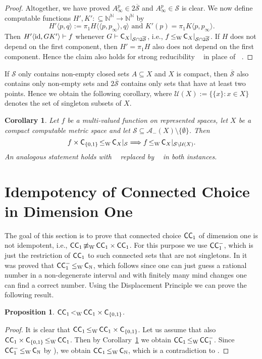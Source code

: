 \documentclass[a4paper]{amsart}
\def\AA{{\mathcal A}}
\def\SS{{\mathcal S}}
\def\UU{{\mathcal U}}
\def\IN{{\mathbb{N}}}
\def\TO{\Longrightarrow}
\def\In{\subseteq}
\def\id{{\rm id}}
\def\C{\mbox{\rm\sffamily C}}
\def\ConC{\mbox{\rm\sffamily CC}}
\def\leqW{\mathop{\leq_{\mathrm{W}}}}
\def\nequivW{\mathop{\not\equiv_{\mathrm{W}}}}
\def\leqSW{\mathop{\leq_{\mathrm{sW}}}}
\def\lW{\mathop{<_{\mathrm{W}}}}
\newtheorem{proposition}[theorem]{Proposition}
\newtheorem{corollary}[theorem]{Corollary}
\theoremstyle{definition}
\begin{document}
\begin{proof}
Altogether, we have proved $A_\infty^p\in2\overline{\SS}$ and $A_\infty^p\in\SS$ is clear.
We now define computable functions $H',K':\In\IN^\IN\to\IN^\IN$ by
\[H'\langle p,q\rangle:=\pi_1H\langle\langle p,p_\infty\rangle,q\rangle\mbox{ and }K'(p)=\pi_1K\langle p,p_\infty\rangle.\]
Then $H'\langle\id,GK'\rangle\vdash f$ whenever $G\vdash\C_X|_{\SS\cap2\overline{\SS}}$, i.e., $f\leqW\C_X|_{\SS\cap2\overline{\SS}}$.
If $H$ does not depend on the first component, then $H'=\pi_1H$ also does not depend on the first component. 
Hence the claim also holds for strong reducibility $\leqSW$ in place of $\leqW$. 
\end{proof}

If $\SS$ only contains non-empty closed sets $A\In X$ and $X$ is compact, then $\overline{\SS}$
also contains only non-empty sets and $2\overline{\SS}$ contains only sets that have at least
two points. Hence we obtain the following corollary, where $\UU(X):=\{\{x\}:x\in X\}$ denotes the
set of singleton subsets of $X$.

\begin{corollary}
\label{cor:displacement}
Let $f$ be a multi-valued function on represented spaces, 
let $X$ be a compact computable metric space and let $\SS\In\AA_-(X)\setminus\{\emptyset\}$.
Then
\[f\times\C_{\{0,1\}}\leqW\C_X|_\SS\TO f\leqW\C_X|_{\SS\setminus\UU(X)}.\]
An analogous statement holds with $\leqW$ replaced by $\leqSW$ in both instances.
\end{corollary} 


\section{Idempotency of Connected Choice in Dimension One}
\label{sec:idempotency}

The goal of this section is to prove that connected choice $\ConC_1$ of dimension one is 
not idempotent, i.e., $\ConC_1\nequivW\ConC_1\times\ConC_1$.
For this purpose we use $\ConC_1^-$, which is just the restriction of $\ConC_1$ 
to such connected sets that are not singletons. In \cite{BG11a} it was proved that
$\ConC_1^-\leqW\C_\IN$, which follows since one can just guess a rational number in a 
non-degenerate interval and with finitely many mind changes one can find a correct number.
Using the Displacement Principle we can prove the following result.

\begin{proposition}
\label{prop:CC-factor}
$\ConC_1\lW\ConC_1\times\C_{\{0,1\}}$.
\end{proposition}
\begin{proof}
It is clear that $\ConC_1\leqW\ConC_1\times\C_{\{0,1\}}$. 
Let us assume that also $\ConC_1\times\C_{\{0,1\}}\leqW\ConC_1$.
Then by Corollary~\ref{cor:displacement} we obtain $\ConC_1\leqW\ConC_1^-$.
Since $\ConC_1^-\leqW\C_\IN$ by \cite[Proposition~3.8]{BG11a}), we obtain
$\ConC_1\leqW\C_\IN$, which is a contradiction to \cite[Lemma~4.9]{BG11a}.
\end{proof}
\end{document}
